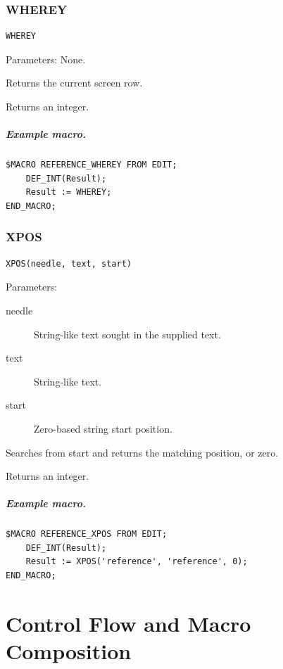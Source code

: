 \documentclass[a4paper,10pt,twoside,openany]{book}
\begin{document}
\label{prim:intrinsic-wherey}
\subsection*{WHEREY}
\begin{verbatim}
WHEREY
\end{verbatim}
Parameters: None.

Returns the current screen row.

Returns an integer.

\paragraph{Example macro.}
\begin{verbatim}
$MACRO REFERENCE_WHEREY FROM EDIT;
    DEF_INT(Result);
    Result := WHEREY;
END_MACRO;
\end{verbatim}

\label{prim:intrinsic-xpos}
\subsection*{XPOS}
\begin{verbatim}
XPOS(needle, text, start)
\end{verbatim}
Parameters:
\begin{description}
\item[needle] String-like text sought in the supplied text.
\item[text] String-like text.
\item[start] Zero-based string start position.
\end{description}

Searches from start and returns the matching position, or zero.

Returns an integer.

\paragraph{Example macro.}
\begin{verbatim}
$MACRO REFERENCE_XPOS FROM EDIT;
    DEF_INT(Result);
    Result := XPOS('reference', 'reference', 0);
END_MACRO;
\end{verbatim}


\chapter{Control Flow and Macro Composition}
\end{document}
